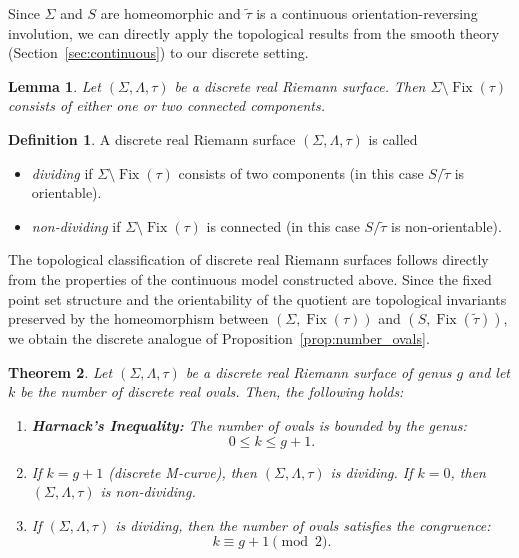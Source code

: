 \documentclass[11pt,a4paper]{article}
\newtheorem{theorem}{Theorem}[section]
\newtheorem{lemma}[theorem]{Lemma}
\theoremstyle{definition}
\newtheorem*{definition}{Definition}
\DeclareMathOperator{\fix}{\mathrm{Fix}}
\begin{document}
Since $\Sigma$ and $S$ are homeomorphic and $\tilde{\tau}$ is a continuous orientation-reversing involution, we can directly apply the topological results from the smooth theory (Section~\ref{sec:continuous}) to our discrete setting.

\begin{lemma}\label{lem:12components_discrete}
	Let $(\Sigma, \Lambda, \tau)$ be a discrete real Riemann surface. Then $\Sigma \setminus \fix(\tau)$ consists of either one or two connected components.
\end{lemma}

\begin{definition}
	A discrete real Riemann surface $(\Sigma, \Lambda, \tau)$ is called
	\begin{itemize}
		\item \emph{dividing} if $\Sigma \setminus \fix(\tau)$ consists of two components (in this case $S / \tilde{\tau}$ is orientable).
		\item \emph{non-dividing} if $\Sigma \setminus \fix(\tau)$ is connected (in this case $S / \tilde{\tau}$ is non-orientable).
	\end{itemize}
\end{definition}

The topological classification of discrete real Riemann surfaces follows directly from the properties of the continuous model constructed above. Since the fixed point set structure and the orientability of the quotient are topological invariants preserved by the homeomorphism between $(\Sigma, \fix(\tau))$ and $(S, \fix(\tilde{\tau}))$, we obtain the discrete analogue of Proposition~\ref{prop:number_ovals}.

\begin{theorem}\label{th:number_ovals_discrete}
	Let $(\Sigma, \Lambda, \tau)$ be a discrete real Riemann surface of genus $g$ and let $k$ be the number of discrete real ovals. Then, the following holds:
	\begin{enumerate}
		\item[(i)] \textbf{Harnack's Inequality:} The number of ovals is bounded by the genus:
		\[ 0 \leq k \leq g+1. \]
		\item[(ii)] If $k=g+1$ (discrete M-curve), then $(\Sigma, \Lambda, \tau)$ is dividing. If $k=0$, then $(\Sigma, \Lambda, \tau)$ is non-dividing.
		\item[(iii)] If $(\Sigma, \Lambda, \tau)$ is dividing, then the number of ovals satisfies the congruence:
		\[ k \equiv g+1 \pmod 2. \]
	\end{enumerate}
\end{theorem}
\end{document}
